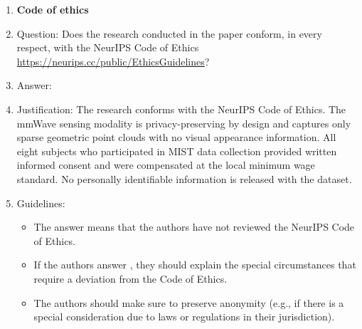 \begin{enumerate}
\item {\bf Code of ethics}
    \item[] Question: Does the research conducted in the paper conform, in every respect, with the NeurIPS Code of Ethics \url{https://neurips.cc/public/EthicsGuidelines}?
    \item[] Answer: \answerYes{}
    \item[] Justification: The research conforms with the NeurIPS Code of Ethics. The mmWave sensing modality is privacy-preserving by design and captures only sparse geometric point clouds with no visual appearance information. All eight subjects who participated in MIST data collection provided written informed consent and were compensated at the local minimum wage standard. No personally identifiable information is released with the dataset.
    \item[] Guidelines:
    \begin{itemize}
        \item The answer \answerNA{} means that the authors have not reviewed the NeurIPS Code of Ethics.
        \item If the authors answer \answerNo, they should explain the special circumstances that require a deviation from the Code of Ethics.
        \item The authors should make sure to preserve anonymity (e.g., if there is a special consideration due to laws or regulations in their jurisdiction).
    \end{itemize}



\end{enumerate}
